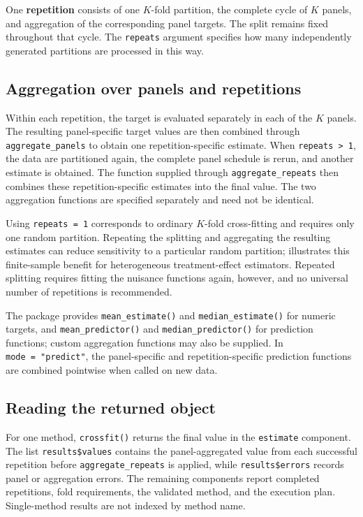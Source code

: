 One \textbf{repetition} consists of one \(K\)-fold partition, the complete cycle of \(K\) panels, and aggregation of the corresponding panel targets. The split remains fixed throughout that cycle. The \texttt{repeats} argument specifies how many independently generated partitions are processed in this way.

\subsection{Aggregation over panels and repetitions}\label{subsec:aggregation}

Within each repetition, the target is evaluated separately in each of the \(K\) panels. The resulting panel-specific target values are then combined through \texttt{aggregate\_panels} to obtain one repetition-specific estimate. When \texttt{repeats\ \textgreater{}\ 1}, the data are partitioned again, the complete panel schedule is rerun, and another estimate is obtained. The function supplied through \texttt{aggregate\_repeats} then combines these repetition-specific estimates into the final value. The two aggregation functions are specified separately and need not be identical.

Using \texttt{repeats\ =\ 1} corresponds to ordinary \(K\)-fold cross-fitting and requires only one random partition. Repeating the splitting and aggregating the resulting estimates can reduce sensitivity to a particular random partition; \citet{jacob2020} illustrates this finite-sample benefit for heterogeneous treatment-effect estimators. Repeated splitting requires fitting the nuisance functions again, however, and no universal number of repetitions is recommended.

The package provides \texttt{mean\_estimate()} and \texttt{median\_estimate()} for numeric targets, and \texttt{mean\_predictor()} and \texttt{median\_predictor()} for prediction functions; custom aggregation functions may also be supplied. In \texttt{mode\ =\ "predict"}, the panel-specific and repetition-specific prediction functions are combined pointwise when called on new data.

\subsection{Reading the returned object}\label{subsec:first-result}

For one method, \texttt{crossfit()} returns the final value in the \texttt{estimate} component. The list \texttt{results\$values} contains the panel-aggregated value from each successful repetition before \texttt{aggregate\_repeats} is applied, while \texttt{results\$errors} records panel or aggregation errors. The remaining components report completed repetitions, fold requirements, the validated method, and the execution plan. Single-method results are not indexed by method name.

